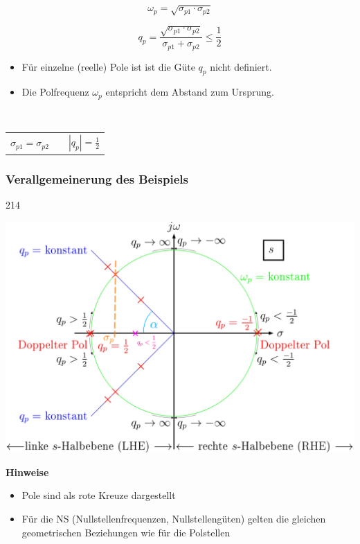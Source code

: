 \begin{minipage}[c]{0.48\columnwidth}
    $$ \boxed{ \omega_p = \sqrt{\sigma_{p1} \cdot \sigma_{p2} } } $$
\end{minipage}
\hfill
\begin{minipage}[c]{0.48\columnwidth}
    $$ \boxed{ q_p =  \frac{\sqrt{\sigma_{p1} \cdot \sigma_{p2}}}{\sigma_{p1} + \sigma_{p2}} \leq \frac{1}{2} } $$
\end{minipage}

\begin{itemize}
    \item[\textrightarrow] Für einzelne (reelle) Pole ist ist die Güte $q_p$ nicht definiert.
    \item[\textrightarrow] Die Polfrequenz $\omega_p$ entspricht dem Abstand zum Ursprung.
\end{itemize}

\textbf{} \\
\begin{tabular}{c c c}
    $\sigma_{p1} = \sigma_{p2}$ & & $| q_p | = \frac{1}{2}$
\end{tabular}


\subsubsection{Verallgemeinerung des Beispiels}{214}

\begin{minipage}[c]{0.55\columnwidth}
    \includegraphics[width=\columnwidth]{images/pole_nullstellen_koeffizienten.png}
\end{minipage}
\hfill
\begin{minipage}[c]{0.42\columnwidth}
    \raggedright%
    \textbf{Hinweise}
    \begin{itemize}
        \item Pole sind als rote Kreuze dargestellt
        \item Für die NS (Nullstellenfrequenzen, Nullstellengüten) gelten die gleichen
            geometrischen Beziehungen wie für die Polstellen
    \end{itemize}
\end{minipage}




